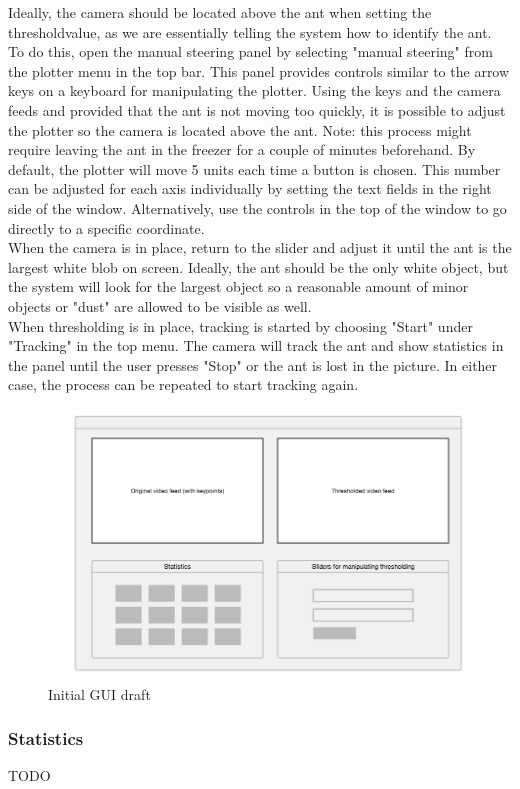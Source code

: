 Ideally, the camera should be located above the ant when setting the thresholdvalue, as we are essentially telling the system how to identify the ant. To do this, open the manual steering panel by selecting "manual steering" from the plotter menu in the top bar. This panel provides controls similar to the arrow keys on a keyboard for manipulating the plotter. Using the keys and the camera feeds and provided that the ant is not moving too quickly, it is possible to adjust the plotter so the camera is located above the ant. Note: this process might require leaving the ant in the freezer for a couple of minutes beforehand. By default, the plotter will move 5 units each time a button is chosen. This number can be adjusted for each axis individually by setting the text fields in the right side of the window. Alternatively, use the controls in the top of the window to go directly to a specific coordinate. \\

When the camera is in place, return to the slider and adjust it until the ant is the largest white blob on screen. Ideally, the ant should be the only white object, but the system will look for the largest object so a reasonable amount of minor objects or "dust" are allowed to be visible as well. \\

When thresholding is in place, tracking is started by choosing "Start" under "Tracking" in the top menu. The camera will track the ant and show statistics in the panel until the user presses "Stop" or the ant is lost in the picture. In either case, the process can be repeated to start tracking again.


\begin{figure}[!ht]
    \centering
    \includegraphics[scale = 0.3]{img/termes_gui.png}
    \caption{Initial GUI draft}
    \label{fig:gui}
\end{figure}

\subsubsection{Statistics} \mbox{}\par

TODO

